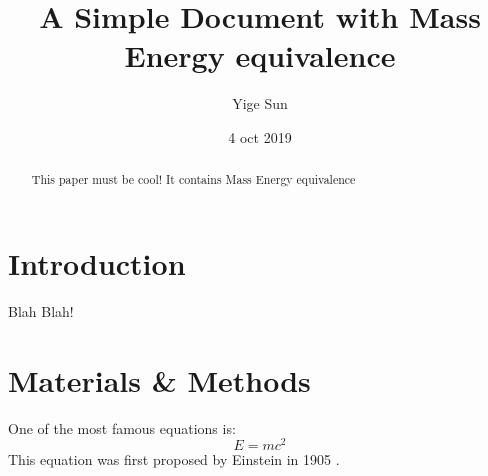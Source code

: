 \documentclass[12pt]{article}
\title{A Simple Document with Mass Energy equivalence}
\author{Yige Sun}
\date{4 oct 2019}
\begin{document}
  \maketitle
  
  \begin{abstract}
    This paper must be cool!
    It contains Mass Energy equivalence
  \end{abstract}
  
  \section{Introduction}
    Blah Blah!
  
  \section{Materials \& Methods}
  One of the most famous equations is:
  \begin{equation}
    E = mc^2
  \end{equation}
  This equation was first proposed by Einstein in 1905 
  \cite{einstein1905does}.
  
  
  
\end{document}
